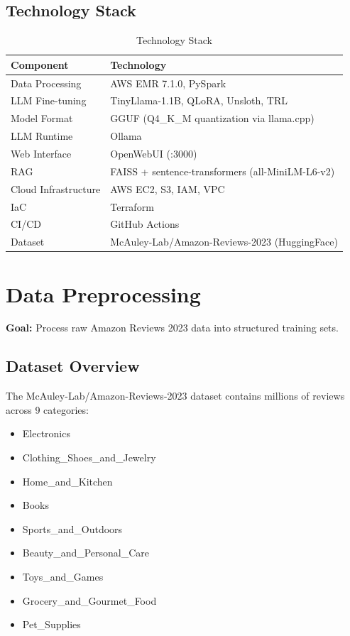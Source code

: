\documentclass[12pt,a4paper]{article}
\begin{document}
\subsection{Technology Stack}

\begin{table}[h!]
\centering
\caption{Technology Stack}
\begin{tabular}{ll}
\toprule
Component & Technology \\
\midrule
Data Processing & AWS EMR 7.1.0, PySpark \\
LLM Fine-tuning & TinyLlama-1.1B, QLoRA, Unsloth, TRL \\
Model Format & GGUF (Q4\_K\_M quantization via llama.cpp) \\
LLM Runtime & Ollama \\
Web Interface & OpenWebUI (:3000) \\
RAG & FAISS + sentence-transformers (all-MiniLM-L6-v2) \\
Cloud Infrastructure & AWS EC2, S3, IAM, VPC \\
IaC & Terraform \\
CI/CD & GitHub Actions \\
Dataset & McAuley-Lab/Amazon-Reviews-2023 (HuggingFace) \\
\bottomrule
\end{tabular}
\end{table}

\section{Data Preprocessing}
\label{sec:person1}

\textbf{Goal:} Process raw Amazon Reviews 2023 data into structured training sets.

\subsection{Dataset Overview}

The McAuley-Lab/Amazon-Reviews-2023 dataset contains millions of reviews across 9 categories:

\begin{itemize}
    \item Electronics
    \item Clothing\_Shoes\_and\_Jewelry
    \item Home\_and\_Kitchen
    \item Books
    \item Sports\_and\_Outdoors
    \item Beauty\_and\_Personal\_Care
    \item Toys\_and\_Games
    \item Grocery\_and\_Gourmet\_Food
    \item Pet\_Supplies
\end{itemize}
\end{document}
